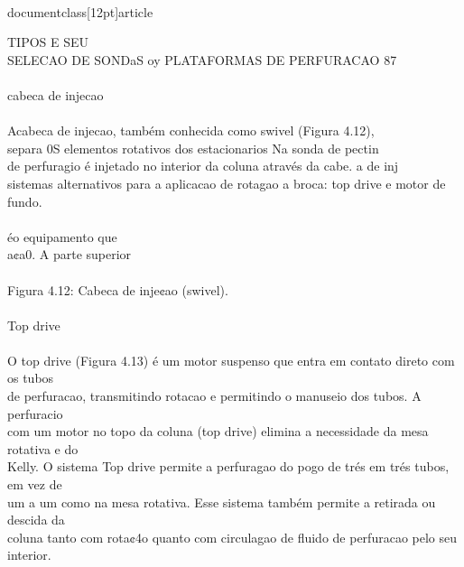 \\documentclass[12pt]{article}
\begin{document}
TIPOS E SEU\\
SELECAO DE SONDaS oy PLATAFORMAS DE PERFURACAO 87\\
\\
cabeca de injecao\\
\\
Acabeca de injecao, também conhecida como swivel (Figura 4.12),\\
separa 0S elementos rotativos dos estacionarios Na sonda de pectin\\
de perfuragio é injetado no interior da coluna através da cabe. a de inj\\
sistemas alternativos para a aplicacao de rotagao a broca: top drive e motor de fundo.\\
\\
éo equipamento que\\
a¢a0. A parte superior\\
\\
Figura 4.12: Cabeca de inje¢ao (swivel).\\
\\
Top drive\\
\\
O top drive (Figura 4.13) é um motor suspenso que entra em contato direto com os tubos\\
de perfuracao, transmitindo rotacao e permitindo o manuseio dos tubos. A perfuracio\\
com um motor no topo da coluna (top drive) elimina a necessidade da mesa rotativa e do\\
Kelly. O sistema Top drive permite a perfuragao do pogo de trés em trés tubos, em vez de\\
um a um como na mesa rotativa. Esse sistema também permite a retirada ou descida da\\
coluna tanto com rota¢4o quanto com circulagao de fluido de perfuracao pelo seu interior.\\
\end{document}
